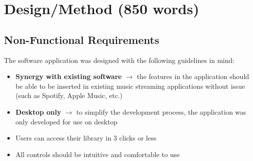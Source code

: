 \chapter{Design/Method (850 words)}

\section{Non-Functional Requirements}
The software application was designed with the following guidelines in mind:\begin{itemize}
    \item \textbf{
        Synergy with existing software
    } \(\to\) the features in the application should be able to be inserted in existing music streaming applications without issue (such as Spotify, Apple Music, etc.) %
    \item \textbf{
        Desktop only
    } \(\to\) to simplify the development process, the application was only developed for use on desktop
    \item Users can access their library in 3 clicks or less %
    \item All controls should be intuitive and comfortable to use
\end{itemize} %


